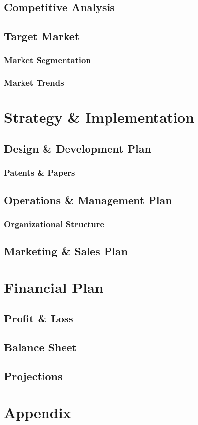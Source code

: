 \documentclass[titlepage]{article}
\begin{document}
\subsection{Competitive Analysis}
\subsection{Target Market}
\subsubsection{Market Segmentation}
\subsubsection{Market Trends}

\section{Strategy \& Implementation}
\subsection{Design \& Development Plan}
\subsubsection{Patents \& Papers}
\subsection{Operations \& Management Plan}
\subsubsection{Organizational Structure}
\subsection{Marketing \& Sales Plan}

\section{Financial Plan}
\subsection{Profit \& Loss}
\subsection{Balance Sheet}
\subsection{Projections}

\section{Appendix}
\end{document}
